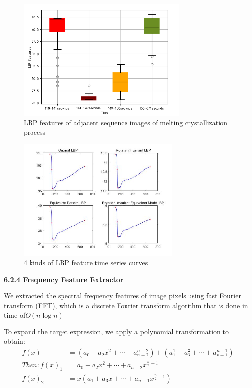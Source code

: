 \documentclass{apmcmthesis}
\begin{document}
\begin{figure}
	\centering
	\includegraphics[height=6cm]{./figures/6-2-lbpxs.png}
	\caption{LBP features of adjacent sequence images of melting crystallization process}
	\label{fig:9}
\end{figure}


\begin{figure}
	\centering
	\includegraphics[height=6cm]{./figures/6-2-lbp.jpg}
	\caption{4 kinds of LBP feature time series curves}
	\label{fig:9}
\end{figure}

\noindent\textbf{6.2.4 Frequency Feature Extractor}	

We extracted the spectral frequency features of image pixels using fast Fourier transform (FFT), which is a discrete Fourier transform algorithm that is done in time of$O(n\log{n})$

To expand the target expression, we apply a polynomial transformation to obtain:
\begin{equation}
	\tag{6-2-6}
	\begin{split}	
		f(x)& = (a_{0}+a_{2}x^{2}+\cdots+a_{n-2}^{n-2})+(a_{1}^{1}+a_{3}^{3}+\cdots+a_{n-1}^{n-1}) \\
	Then: f(x)_{1} & = a_{0}+a_{2}x^{2}+\cdots+a_{n-2}x^{\frac{n}{2}-1} \\
	f(x)_{2} & =x(a_{1}+a_{3}x+\cdots+a_{n-1}x^{\frac{n}{2}-1})
	\end{split}
\end{equation}
\end{document}
